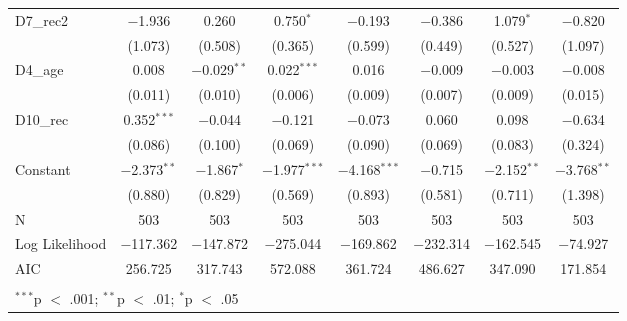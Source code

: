 \documentclass[
]{article}
\begin{document}
\begin{table}[!htbp]
\begin{tabular}{@{\extracolsep{5pt}}lccccccc}
  D7\_rec2 & $-$1.936 & 0.260 & 0.750$^{*}$ & $-$0.193 & $-$0.386 & 1.079$^{*}$ & $-$0.820 \\ 
  & (1.073) & (0.508) & (0.365) & (0.599) & (0.449) & (0.527) & (1.097) \\ 
  D4\_age & 0.008 & $-$0.029$^{**}$ & 0.022$^{***}$ & 0.016 & $-$0.009 & $-$0.003 & $-$0.008 \\ 
  & (0.011) & (0.010) & (0.006) & (0.009) & (0.007) & (0.009) & (0.015) \\ 
  D10\_rec & 0.352$^{***}$ & $-$0.044 & $-$0.121 & $-$0.073 & 0.060 & 0.098 & $-$0.634 \\ 
  & (0.086) & (0.100) & (0.069) & (0.090) & (0.069) & (0.083) & (0.324) \\ 
  Constant & $-$2.373$^{**}$ & $-$1.867$^{*}$ & $-$1.977$^{***}$ & $-$4.168$^{***}$ & $-$0.715 & $-$2.152$^{**}$ & $-$3.768$^{**}$ \\ 
  & (0.880) & (0.829) & (0.569) & (0.893) & (0.581) & (0.711) & (1.398) \\ 
 N & 503 & 503 & 503 & 503 & 503 & 503 & 503 \\ 
Log Likelihood & $-$117.362 & $-$147.872 & $-$275.044 & $-$169.862 & $-$232.314 & $-$162.545 & $-$74.927 \\ 
AIC & 256.725 & 317.743 & 572.088 & 361.724 & 486.627 & 347.090 & 171.854 \\ 
\hline \\[-1.8ex] 
\multicolumn{8}{l}{$^{***}$p $<$ .001; $^{**}$p $<$ .01; $^{*}$p $<$ .05} \\ 
\end{tabular} 
\end{table}
\end{document}
